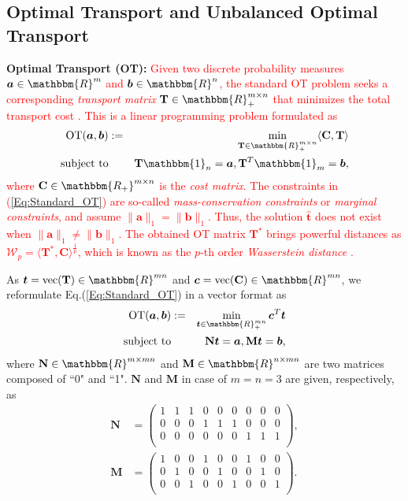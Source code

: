 \documentclass[twoside]{article}
\theoremstyle{plain}
\newcommand{\tranT}{T}
\newcommand{\R}{\mathbbm{R}}
\newcommand{\one}{\mathbbm{1}}
\newcommand{\mat}[1]{\mathbf{#1}}
\renewcommand{\vec}[1]{\bm{#1}}
\newcommand{\changeHK}[1]{\textcolor{red}{#1}}
\begin{document}
\subsection{Optimal Transport and Unbalanced Optimal Transport}
{\bf Optimal Transport (OT):} \changeHK{Given two discrete probability measures $\vec{a}\in \R^{m}$ and $\vec{b} \in \R^{n}$, the standard OT problem seeks a corresponding {\it transport matrix} $\mat{T} \in \R_{+}^{m \times n}$ that minimizes the total transport cost \citep{Kantorovich_1942}. This is a linear programming problem formulated as
\begin{eqnarray}
\label{Eq:Standard_OT}
\operatorname{OT}(\vec{a},\vec{b}) &:=& \min_{ \mat{T} \in \R_{+}^{m \times n}} \langle \mat{C}, \mat{T} \rangle \\
\text{subject\ to}&& \mat{T} \one_n= \vec{a}, \mat{T}^{T}\one_m = \vec{b}, \notag
\end{eqnarray}
where $\mat{C} \in \mathbbm{R_{+}}^{m \times n}$ is the {\it cost matrix}. The constraints in (\ref{Eq:Standard_OT}) are so-called {\it mass-conservation constraints} or {\it marginal constraints}, and assume $\|\vec{a}\|_1 = \|\vec{b}\|_1$. Thus, the solution $\hat{\vec{t}}$ does not exist when $\|\vec{a}\|_1 \neq \|\vec{b}\|_1$. The obtained OT matrix $\mat{T}^*$ brings powerful distances as $\mathcal{W}_p = \langle \mat{T}^*,\mat{C} \rangle^{\frac{1}{p}}$, which is known as the $p$-th order {\it Wasserstein distance} \citep{Villani_2008_OTBook}. 
}

As $\vec{t} = \text{vec}({\mat{T}}) \in \mathbbm{R}^{mn}$ and $\vec{c} = \text{vec}({\mat{C}}) \in \mathbbm{R}^{mn}$, we reformulate Eq.(\ref{Eq:Standard_OT}) in a vector format as \citep{Chapel_NeurIPS_2021}
\begin{eqnarray}
\label{Eq:Vector_OT}
\operatorname{OT}(\vec{a},\vec{b}) &:=& \min_{\vec{t} \in \R_{+}^{mn}} \vec{c}^{\tranT}\vec{t} \\
\text{subject\ to}&& \mat{N}\vec{t} = \vec{a}, \mat{M}\vec{t} = \vec{b}, \notag
\end{eqnarray}
where $\mat{N} \in \R^{m \times mn}$ and $\mat{M} \in \R^{n \times mn}$ are two matrices composed of ``0" and ``1". $\mat{N}$ and $\mat{M}$ in case of $m=n=3$ are given, respectively, as
\begin{equation*}
\begin{split}
\mat{N}&=\begin{pmatrix}
1&1&1& 0& 0& 0& 0& 0&0\\
0 & 0& 0&1&1&1& 0& 0&0\\
0 & 0& 0& 0& 0& 0&1&1&1\\
\end{pmatrix},\\
\mat{M}&=\begin{pmatrix}
 1& 0& 0&1& 0& 0&1& 0&0\\
 0&1& 0& 0&1& 0& 0&1&0\\
 0& 0&1& 0& 0&1& 0& 0&1\\
 \end{pmatrix}.
  \end{split}
 \end{equation*}
\end{document}
